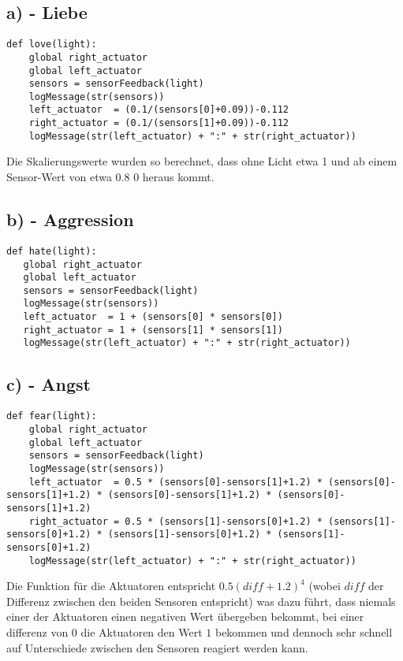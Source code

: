 \documentclass{./Vorlage/mat}
\begin{document}
\subsection*{a) - Liebe}
\begin{lstlisting}
def love(light):
    global right_actuator
    global left_actuator
    sensors = sensorFeedback(light)
    logMessage(str(sensors))
    left_actuator  = (0.1/(sensors[0]+0.09))-0.112
    right_actuator = (0.1/(sensors[1]+0.09))-0.112
    logMessage(str(left_actuator) + ":" + str(right_actuator))
\end{lstlisting}

Die Skalierungswerte wurden so berechnet, dass ohne Licht etwa 1 und ab einem Sensor-Wert von etwa 0.8 0 heraus kommt.

\subsection*{b) - Aggression}
\begin{lstlisting}
def hate(light):
   global right_actuator
   global left_actuator
   sensors = sensorFeedback(light)
   logMessage(str(sensors))
   left_actuator  = 1 + (sensors[0] * sensors[0])
   right_actuator = 1 + (sensors[1] * sensors[1])
   logMessage(str(left_actuator) + ":" + str(right_actuator))
\end{lstlisting}

\subsection*{c) - Angst}
\begin{lstlisting}
def fear(light):
    global right_actuator
    global left_actuator
    sensors = sensorFeedback(light)
    logMessage(str(sensors))
    left_actuator  = 0.5 * (sensors[0]-sensors[1]+1.2) * (sensors[0]-sensors[1]+1.2) * (sensors[0]-sensors[1]+1.2) * (sensors[0]-sensors[1]+1.2)
    right_actuator = 0.5 * (sensors[1]-sensors[0]+1.2) * (sensors[1]-sensors[0]+1.2) * (sensors[1]-sensors[0]+1.2) * (sensors[1]-sensors[0]+1.2)
    logMessage(str(left_actuator) + ":" + str(right_actuator))  
\end{lstlisting}

Die Funktion für die Aktuatoren entspricht $ 0.5 (diff+1.2)^4$ (wobei $diff$ der Differenz zwischen den beiden Sensoren entspricht) was dazu führt, dass niemals einer der Aktuatoren einen negativen Wert übergeben bekommt, bei einer differenz von 0 die Aktuatoren den Wert $1$ bekommen und dennoch sehr schnell auf Unterschiede zwischen den Sensoren reagiert werden kann.
\end{document}
